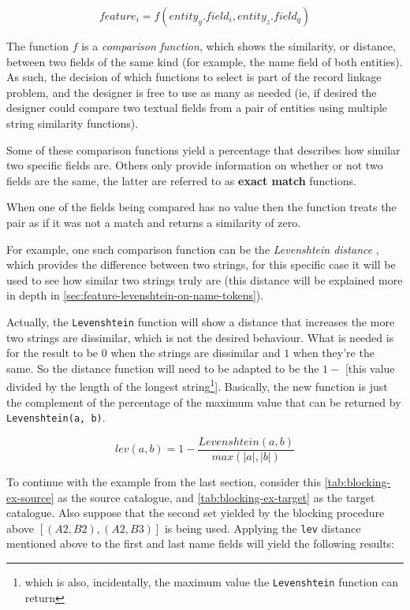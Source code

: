 \documentclass[epsfig,a4paper,11pt,titlepage,twoside,openany]{book}
\begin{document}
$$
feature_i = f(entity_y.field_i , entity_z.field_q)
$$

The function $f$ is a \textit{comparison function}, which shows the
similarity, or distance, between two fields of the same kind (for example, the name field of both entities). As such, the decision of which functions to select is
part of the record linkage problem, and the designer is free to use as many as needed (ie, if desired the designer could compare two textual fields from a pair of entities
using multiple string similarity functions).

Some of these comparison functions yield a percentage that describes how
similar two specific fields are. Others only provide information on whether or not two fields are the same,
the latter are referred to as \textbf{exact match} functions.

When one of the fields being compared has no value then the function treats the
pair as if it was not a match and returns a similarity of zero.

For example, one such comparison function can be the \textit{Levenshtein distance} \cite{levenshtein1966binary}, which provides the difference between two strings, for this specific case it will be used to see how similar two strings truly are (this distance will be explained more in depth in \autoref{sec:feature-levenshtein-on-name-tokens}). 

Actually, the \texttt{Levenshtein} function will show a distance that increases the more two strings are dissimilar, which is not the desired behaviour. What is needed is for the result to be $0$ when the strings are dissimilar and $1$ when they're the same. So the distance function will need to be adapted to be the $1 -$ [this value divided by the length of the longest string\footnote{which is also, incidentally, the maximum value the \texttt{Levenshtein} function can return}]. Basically, the new function is just the complement of the percentage of the maximum value that can be returned by \texttt{Levenshtein(a, b)}.

$$
lev(a,b) = 1 - \frac{Levenshtein(a, b)}{max(|a|, |b|)}
$$

To continue with the example from the last section, consider this \autoref{tab:blocking-ex-source} as the source catalogue, and \autoref{tab:blocking-ex-target} as the target catalogue. Also suppose that the second
set yielded by the blocking procedure above $[(A2, B2), (A2, B3)]$ is being used. Applying the
\texttt{lev} distance mentioned above to the first and last name fields will
yield the following results:
\end{document}
